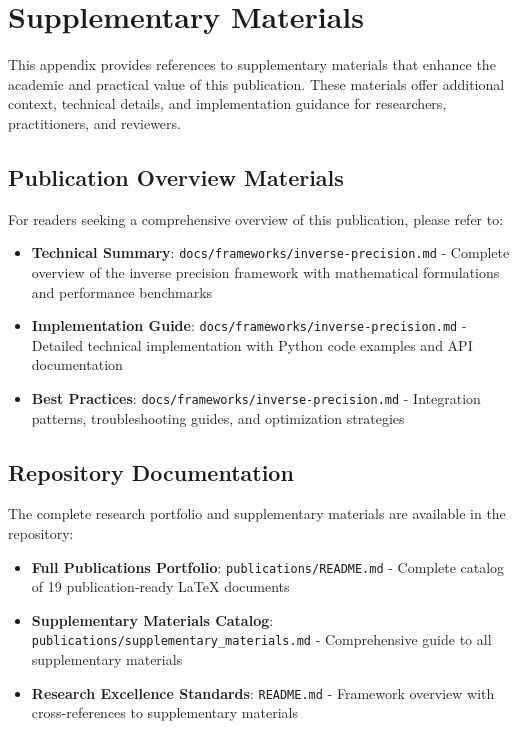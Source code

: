 \documentclass[11pt,a4paper]{article}
\begin{document}
\appendix
\section{Supplementary Materials}
\label{appendix:supplementary}

This appendix provides references to supplementary materials that enhance the academic and practical value of this publication. These materials offer additional context, technical details, and implementation guidance for researchers, practitioners, and reviewers.

\subsection{Publication Overview Materials}

For readers seeking a comprehensive overview of this publication, please refer to:
\begin{itemize}
\item \textbf{Technical Summary}: \texttt{docs/frameworks/inverse-precision.md} - Complete overview of the inverse precision framework with mathematical formulations and performance benchmarks
\item \textbf{Implementation Guide}: \texttt{docs/frameworks/inverse-precision.md} - Detailed technical implementation with Python code examples and API documentation
\item \textbf{Best Practices}: \texttt{docs/frameworks/inverse-precision.md} - Integration patterns, troubleshooting guides, and optimization strategies
\end{itemize}

\subsection{Repository Documentation}

The complete research portfolio and supplementary materials are available in the repository:
\begin{itemize}
\item \textbf{Full Publications Portfolio}: \texttt{publications/README.md} - Complete catalog of 19 publication-ready LaTeX documents
\item \textbf{Supplementary Materials Catalog}: \texttt{publications/supplementary\_materials.md} - Comprehensive guide to all supplementary materials
\item \textbf{Research Excellence Standards}: \texttt{README.md} - Framework overview with cross-references to supplementary materials
\end{itemize}
\end{document}
